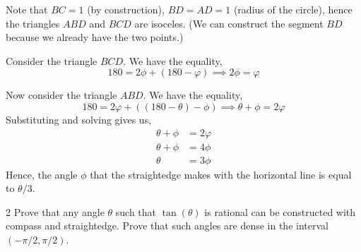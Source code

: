 \documentclass[12pt]{article}
\begin{document}
\begin{solution}
    \bbni

    \begin{center}
    \end{center}

    Note that $BC = 1$ (by construction), $BD = AD = 1$ (radius of the circle), hence the triangles $ABD$ and $BCD$ are isoceles. (We can construct the segment $BD$ because we already have the two points.)

    Consider the triangle $BCD$. We have the equality, 
    \[180 = 2\phi + (180 - \varphi) \implies 2 \phi = \varphi\]

    Now consider the triangle $ABD$. We have the equality, 
    \[180 = 2\varphi + ((180 - \theta) - \phi) \implies \theta + \phi = 2 \varphi\]
    Substituting and solving gives us, 
    \begin{align*}
        \theta + \phi &= 2 \varphi \\
        \theta + \phi &= 4 \phi \\ 
        \theta  &= 3 \phi
    \end{align*}
    Hence, the angle $\phi$ that the straightedge makes with the horizontal line is equal to $\theta/3$. 
\end{solution}

\newpage

\begin{problem}{2}
    Prove that any angle $\theta$ such that $\tan(\theta)$ is rational can be constructed with compass and straightedge. Prove that such angles are dense in the interval $(-\pi/2,\pi/2)$.
\end{problem}
\end{document}
